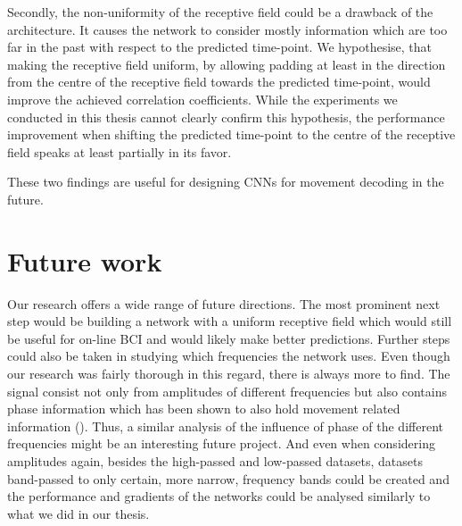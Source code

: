 Secondly, the non-uniformity of the receptive field could be a drawback of the architecture.
It causes the network to consider mostly information which are too far in the past with respect to the predicted time-point.
We hypothesise, that making the receptive field uniform, by allowing padding at least in the direction from the centre of the receptive field towards the predicted time-point, would improve the achieved correlation coefficients.
While the experiments we conducted in this thesis cannot clearly confirm this hypothesis, the performance improvement when shifting the predicted time-point to the centre of the receptive field speaks at least partially in its favor. 

These two findings are useful for designing CNNs for movement decoding in the future.

\section*{Future work}
Our research offers a wide range of future directions.
The most prominent next step would be building a network with a uniform receptive field which would still be useful for on-line BCI and would likely make better predictions.
Further steps could also be taken in studying which frequencies the network uses.
Even though our research was fairly thorough in this regard, there is always more to find.
The signal consist not only from amplitudes of different frequencies but also contains phase information which has been shown to also hold movement related information (\cite{Hammer-2021, hartmann-hierarchical-2018}). 
Thus, a similar analysis of the influence of phase of the different frequencies might be an interesting future project.
And even when considering amplitudes again, besides the high-passed and low-passed datasets, datasets band-passed to only certain, more narrow, frequency bands could be created and the performance and gradients of the networks could be analysed similarly to what we did in our thesis.




